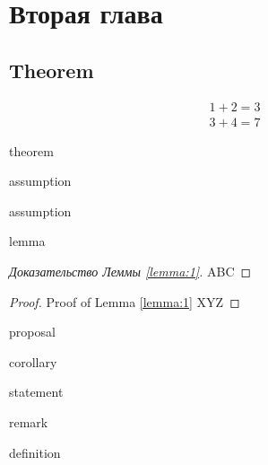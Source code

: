 \chapter{Вторая глава}
\label{ch:ch2}

\section{Theorem} \label{chap1:sec1}

	\begin{align} \label{eq:sec1}
		1+2=3	\\
		3+4=7
	\end{align}

	\begin{theorem}
		theorem
	\end{theorem}
	
	\begin{assumption}
		assumption
	\end{assumption}
	\begin{assumption}
		assumption
	\end{assumption}
	
	\begin{lemma}
		\label{lemma:1}
		lemma
	\end{lemma}
	
	\begin{proof}[Доказательство Леммы \ref{lemma:1}]
		ABC 
	\end{proof}
	\begin{proof} Proof of Lemma \cref{lemma:1}
		XYZ
	\end{proof}
	
	\begin{proposal}
		proposal
	\end{proposal}
		
	\begin{corollary}
		corollary
	\end{corollary}
	
	\begin{statement}
		statement
	\end{statement}
	
	\begin{remark}
		remark
	\end{remark}
	
	\begin{definition}
		definition
	\end{definition}
	
